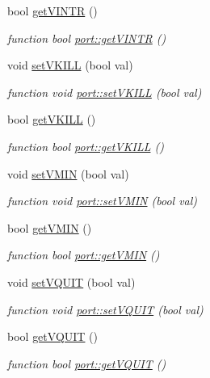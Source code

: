 \begin{DoxyCompactItemize}
bool \hyperlink{classport_a7e274f5ddc4db2e0e613f10e14022a56}{get\+V\+I\+N\+TR} ()
\begin{DoxyCompactList}\small\item\em function bool \hyperlink{classport_a7e274f5ddc4db2e0e613f10e14022a56}{port\+::get\+V\+I\+N\+TR} () \end{DoxyCompactList}\item 
void \hyperlink{classport_a98b0148cac1cc3d9c7c0ae4b6224bcd5}{set\+V\+K\+I\+LL} (bool val)
\begin{DoxyCompactList}\small\item\em function void \hyperlink{classport_a98b0148cac1cc3d9c7c0ae4b6224bcd5}{port\+::set\+V\+K\+I\+LL} (bool val) \end{DoxyCompactList}\item 
bool \hyperlink{classport_a3d0ee5aefacdf3a0603415279c8b1f2e}{get\+V\+K\+I\+LL} ()
\begin{DoxyCompactList}\small\item\em function bool \hyperlink{classport_a3d0ee5aefacdf3a0603415279c8b1f2e}{port\+::get\+V\+K\+I\+LL} () \end{DoxyCompactList}\item 
void \hyperlink{classport_a4540b03345ee1d14fcc66e4f497ee53a}{set\+V\+M\+IN} (bool val)
\begin{DoxyCompactList}\small\item\em function void \hyperlink{classport_a4540b03345ee1d14fcc66e4f497ee53a}{port\+::set\+V\+M\+IN} (bool val) \end{DoxyCompactList}\item 
bool \hyperlink{classport_ada55fc3ad061d8ba22c43431033c99c2}{get\+V\+M\+IN} ()
\begin{DoxyCompactList}\small\item\em function bool \hyperlink{classport_ada55fc3ad061d8ba22c43431033c99c2}{port\+::get\+V\+M\+IN} () \end{DoxyCompactList}\item 
void \hyperlink{classport_ad1f7146621d17e698fdf3ae9e351638a}{set\+V\+Q\+U\+IT} (bool val)
\begin{DoxyCompactList}\small\item\em function void \hyperlink{classport_ad1f7146621d17e698fdf3ae9e351638a}{port\+::set\+V\+Q\+U\+IT} (bool val) \end{DoxyCompactList}\item 
bool \hyperlink{classport_abd1ce4d2e9195cce6c34b09d08bc17a1}{get\+V\+Q\+U\+IT} ()
\begin{DoxyCompactList}\small\item\em function bool \hyperlink{classport_abd1ce4d2e9195cce6c34b09d08bc17a1}{port\+::get\+V\+Q\+U\+IT} () \end{DoxyCompactList}\item 

\end{DoxyCompactItemize}

